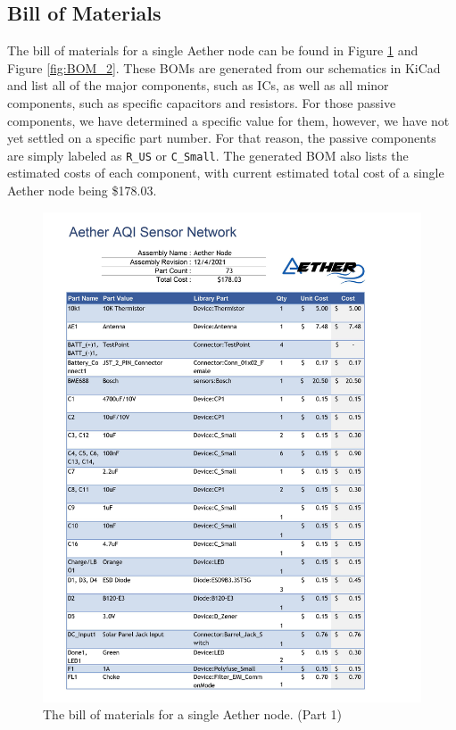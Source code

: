 \subsection{Bill of Materials}
The bill of materials for a single Aether node can be found in Figure \ref{fig:BOM_1} and Figure \ref{fig:BOM_2}. These BOMs are generated from our schematics in KiCad and list all of the major components, such as ICs, as well as all minor components, such as specific capacitors and resistors. For those passive components, we have determined a specific value for them, however, we have not yet settled on a specific part number. For that reason, the passive components are simply labeled as \texttt{R\_US} or \texttt{C\_Small}. The generated BOM also lists the estimated costs of each component, with current estimated total cost of a single Aether node being \$178.03.


\begin{figure}[H]
    \centering
    \includegraphics[width=6in]{figures/BOM_1.jpg}
    \caption{The bill of materials for a single Aether node. (Part 1)}
    \label{fig:BOM_1} 
\end{figure}

